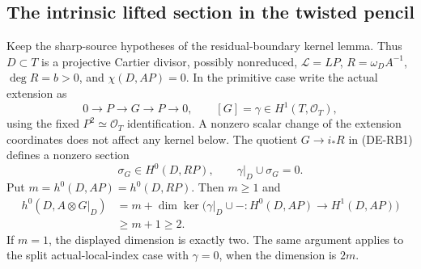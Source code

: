 \subsection{The intrinsic lifted section in the twisted pencil}

\begin{lemma}
\label{lem:DE-A3-twisted-pencil-lift}
Keep the sharp-source hypotheses of the residual-boundary kernel lemma.
Thus $D\subset T$ is a projective Cartier divisor, possibly nonreduced,
$\mathcal L=LP$, $R=\omega_D A^{-1}$, $\deg R=b>0$, and
$\chi(D,AP)=0$. In the primitive case write the actual extension as
\[
0\longrightarrow P\longrightarrow G\longrightarrow P\longrightarrow0,
\qquad [G]=\gamma\in H^1(T,\mathcal O_T),
\]
using the fixed $P^2\simeq\mathcal O_T$ identification. A nonzero
scalar change of the extension coordinates does not affect any kernel
below. The quotient $G\to i_*R$ in (DE-RB1) defines a nonzero section
\[
\sigma_G\in H^0(D,RP),\qquad
                   \gamma|_D\cup\sigma_G=0.
\tag{DE-TL1}
\]
Put $m=h^0(D,AP)=h^0(D,RP)$. Then $m\ge1$ and
\[
\begin{split}
h^0(D,A\otimes G|_D)
 &=m+\dim\ker\bigl(\gamma|_D\cup-:
                    H^0(D,AP)\longrightarrow H^1(D,AP)\bigr)\\
 &\ge m+1\ge2.
\end{split}
\tag{DE-TL2}
\]
If $m=1$, the displayed dimension is exactly two. The same argument
applies to the split actual-local-index case with $\gamma=0$, when
the dimension is $2m$.
\end{lemma}
